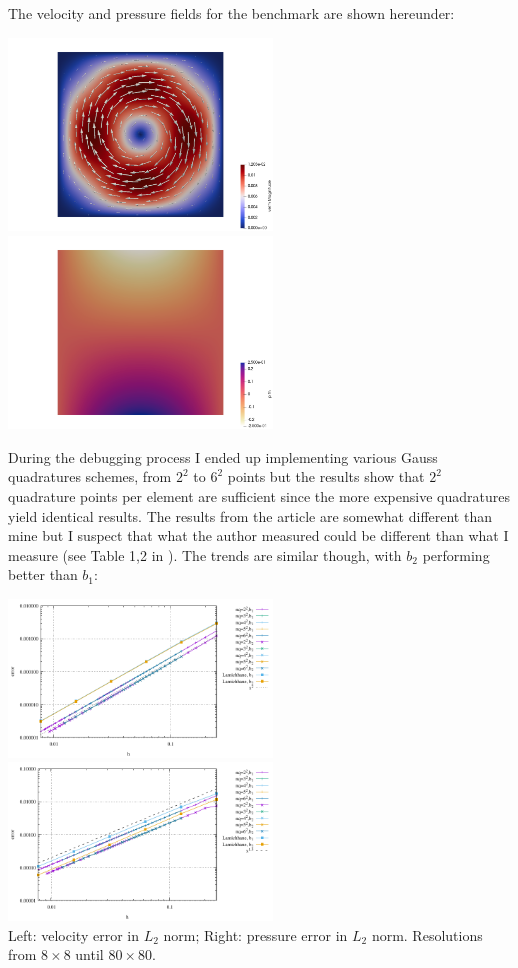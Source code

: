 The velocity and pressure fields for the benchmark are shown hereunder:
\begin{center}
\includegraphics[width=7cm]{python_codes/fieldstone_72/results/mms/vel}
\includegraphics[width=7cm]{python_codes/fieldstone_72/results/mms/p}
\end{center}

During the debugging process I ended up 
implementing various Gauss quadratures schemes, from $2^2$ to $6^2$ points but the results
show that $2^2$ quadrature points per element are sufficient since the more expensive quadratures
yield identical results. 
The results from the article are somewhat different than mine but I suspect that what the 
author measured could be different than what I measure (see Table 1,2 in \cite{lami17}). 
The trends are similar though, with $b_2$ performing better than $b_1$:

\begin{center}
\includegraphics[width=7cm]{python_codes/fieldstone_72/results/mms/errors_v}
\includegraphics[width=7cm]{python_codes/fieldstone_72/results/mms/errors_p}\\
{\captionfont Left: velocity error in $L_2$ norm; Right: pressure error in $L_2$ norm.
Resolutions from $8\times8$ until $80\times80$.}
\end{center}

